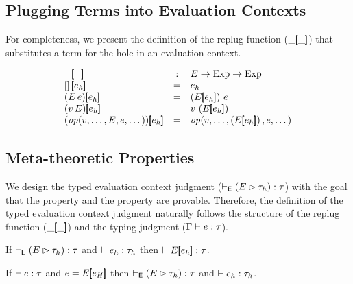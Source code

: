 \documentclass{article}
\begin{document}
\begin{prooftree}
\end{prooftree}

\subsection{Plugging Terms into Evaluation Contexts}

For completeness, we present the definition of the replug function
($\inholeb{\_}{\_}$) that substitutes a term for the hole in an evaluation context.

\[\begin{array}{lcl}
    \inholeb{\_}{\_} & : &
        E \to
        \text{Exp} \to
        \text{Exp}
        \\
    \inholeb{\THole\,}{e_h} & = &
        e_h
        \\
    \inholeb{\left(\TApp{E}{e}\right)}{e_h} & = &
        \TApp{\left( \inholeb{E}{e_h} \right)}{e}
        \\
    \inholeb{\left(\TApp{v}{E}\right)}{e_h} & = &
        \TApp{v}{\left( \inholeb{E}{e_h} \right)}
        \\
    \inholeb{\left(\TOp{v,\dots,E,e,\dots}\right)}{e_h} & = &
        \TOp{v,\dots,\left(\inholeb{E}{e_h}\right),e,\dots}
\end{array}\]

\subsection{Meta-theoretic Properties}

We design the typed evaluation context judgment ($\TContext{E}{\Gt_h}{\Gt}$)
with the goal that the  property and
the  property are provable.
Therefore, the definition of the typed evaluation context
judgment naturally follows the structure of the replug function
($\inholeb{\_}{\_}$) and the typing judgment ($\TTypes{\GG}{e}{\Gt}$).

\begin{prop}\label{prop:replug}
  If $\TContext{E}{\Gt_h}{\Gt}$ and $\TTypes{}{e_h}{\Gt_h}$ then $\TTypes{}{\inholeb{E}{e_h}}{\Gt}$.
\end{prop}

\begin{prop}\label{prop:decomposition}
  If $\TTypes{}{e}{\Gt}$ and $e=\inholeb{E}{e_H}$ then $\TContext{E}{\Gt_h}{\Gt}$ and $\TTypes{}{e_h}{\Gt_h}$.
\end{prop}
\end{document}
